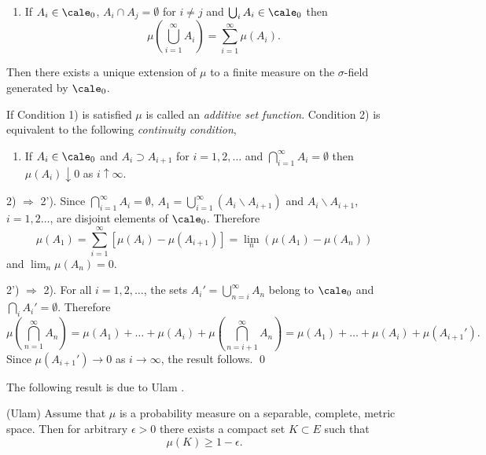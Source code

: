 \documentclass[preprint]{imsart}
\begin{document}
{\begin{Theorem}
\begin{enumerate}
  \item[2)] If $A_i\in\cale_0$, $A_i\cap A_j=\emptyset$
  for $i\ne j$ and $\bigcup_iA_i\in\cale_0$ then
  $$
  \mu (\bigcup_{i=1}^\infty A_i)=\sum_{i=1}^\infty \mu(A_i).
  $$

\end{enumerate}
Then there exists a unique extension of $\mu$ to a
finite measure on the $\sigma$-field generated by
$\cale_0$.
\end{Theorem}

\begin{Remark}\begin{em}
  If Condition 1) is satisfied $\mu$ is called
  an {\em additive set function}. Condition 2) is equivalent
  to the following {\em continuity condition},

\begin{enumerate}
  \item[2')]  If $A_i\in\cale_0$ and $A_i\supset A_{i+1}$ for
  $i=1,2,\ldots$ and $\bigcap_{i=1}^\infty A_i =\emptyset$ then
  $\mu (A_i)\downarrow 0$ as $i\uparrow \infty$.
\end{enumerate}
\end{em}
\end{Remark}


2) $\Rightarrow$ 2'). Since $\bigcap_{i=1}^\infty A_i
=\emptyset$,
$A_1 = \bigcup_{i=1}^\infty (A_i \backslash A_{i+1})$
and $A_i \backslash A_{i+1}$, $i=1,2\ldots$, are
disjoint elements of $\cale_0$. Therefore
$$
\mu (A_1)= \sum_{i=1}^\infty [\mu (A_i)-\mu (A_{i+1})]
= \lim_n (\mu (A_1)-\mu (A_{n}))
$$
and $\lim_n  \mu (A_{n}) =0$.

2') $\Rightarrow$ 2). For all $i=1,2,\ldots$, the sets
$A_i'=\bigcup_{n=i}^\infty A_n$ belong to $\cale_0$ and
$\bigcap_iA_i'=\emptyset$. Therefore
$$
\mu \left(\bigcap_{n=1}^\infty A_n\right) =
\mu (A_1)+\ldots +\mu (A_i) +
\mu \left(\bigcap_{n=i+1}^\infty A_n\right)
 =
\mu (A_1)+\ldots +\mu (A_{i}) +
\mu  (A_{i+1}').
$$
Since $\mu (A_{i+1}') \to 0$ as $i\to\infty$, the
result follows. \qed

The following result is due to Ulam \cite{ulam}.
\begin{Theorem} (Ulam)
Assume that $\mu$ is a probability measure on a
separable, complete, metric space. Then for arbitrary
$\epsilon >0$ there exists a compact set $K\subset E$
such that
$$
\mu (K)\geq 1-\epsilon .
$$
\end{Theorem}

}
\end{document}
